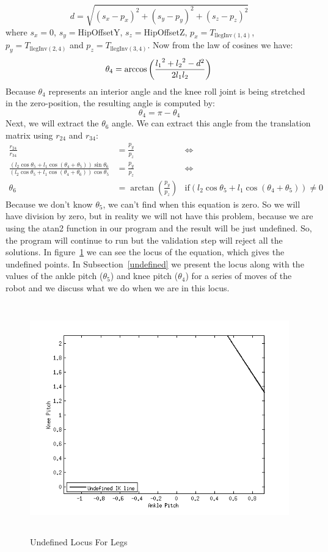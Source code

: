 \[
d = \sqrt{\left(s_x-p_x\right)^2 + \left(s_y-p_y\right)^2 + \left(s_z-p_z\right)^2}
\]
where $s_x = 0$, $s_y = $HipOffsetY, $s_z =$HipOffsetZ, $p_x = T_{\text{llegInv}(1,4)}$, $p_y = T_{\text{llegInv}(2,4)}$ and $p_z = T_{\text{llegInv}(3,4)}$.
Now from the law of cosines we have:
\[
\theta_4 =\arccos\left(\frac{{l_1}^2 + {l_2}^2 - d^2}{2 l_1 l_2}\right)\\
\]
Because $\theta_4$ represents an interior angle and the knee roll joint is being stretched in the zero-position, the resulting angle is computed by:
\[
\theta_4 = \pi - \theta_4
\]
Next, we will extract the $\theta_6$ angle. We can extract this angle from the translation matrix using $r_{24}$ and $r_{34}$:
\begin{align*}
\frac{r_{24}}{r_{34}} &= \frac{p_y}{p_z} &\Leftrightarrow \\
\frac{\left(l_2\cos\theta_5 + l_1 \cos\left(\theta_4 + \theta_5\right)\right)\sin\theta_6}{\left(l_2\cos\theta_5 + l_1 \cos\left(\theta_4 + \theta_6\right)\right) \cos\theta_5} &= \frac{p_y}{p_z} &\Leftrightarrow \\
\theta_6 &= \arctan\left(\frac{p_y}{p_z}\right)&\text{if} \left(l_2\cos\theta_5 + l_1 \cos\left(\theta_4 + \theta_5\right)\right) \neq 0
\end{align*}
Because we don't know $\theta_5$, we can't find when this equation is zero. So we will have division by zero, but in reality we will not have this problem, because we are using the atan2 function in our program and the result will be just undefined. So, the program will continue to run but the validation step will reject all the solutions. In figure~\ref{fig:unlocus} we can see the locus of the equation, which gives the undefined points. In Subsection~\ref{undefined} we present the locus along with the values of the ankle pitch ($\theta_5$) and knee pitch ($\theta_4$) for a series of moves of the robot and we discuss what we do when we are in this locus.

\begin{figure}[!h]
	\begin{center}
		\includegraphics[height = 10cm]{Figures/locus.png}
 		\caption{Undefined Locus For Legs}
 		\label{fig:unlocus}
	\end{center}
\end{figure}

